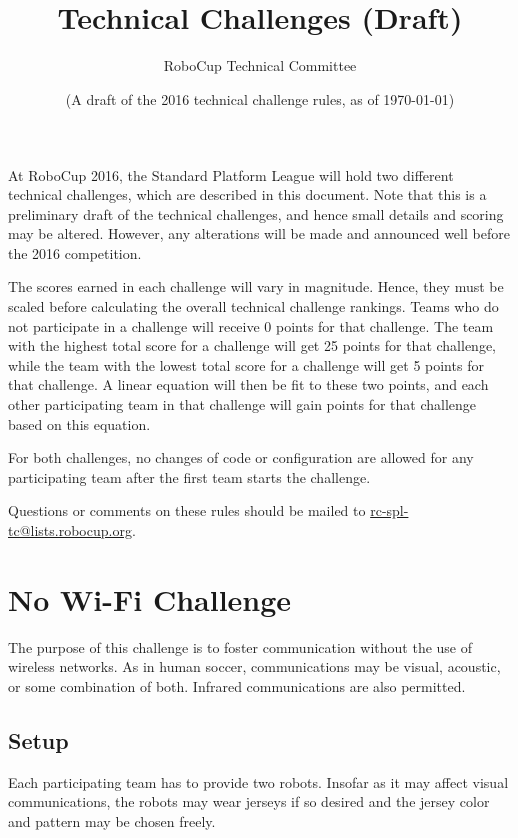 \documentclass[12pt]{article}
\title{\leaguename \\ Technical Challenges (Draft)}
\author{RoboCup Technical Committee}
\date{(A draft of the 2016 technical challenge rules, as of \today)}
\begin{document}
\maketitle

At RoboCup 2016, the Standard Platform League will hold two different technical challenges, which are described in this document.  Note that this is a preliminary draft of the technical challenges, and hence small details and scoring may be altered.  However, any alterations will be made and announced well before the 2016 competition.

The scores earned in each challenge will vary in magnitude.  Hence, they must be scaled before calculating the overall technical challenge rankings.  Teams who do not participate in a challenge will receive 0 points for that challenge.  The team with the highest total score for a challenge will get 25 points for that challenge, while the team with the lowest total score for a challenge will get 5 points for that challenge.  A linear equation will then be fit to these two points, and each other participating team in that challenge will gain points for that challenge based on this equation.

For both challenges, no changes of code or configuration are allowed for any participating team after the first team starts the challenge. 

Questions or comments on these rules should be mailed to {\small \url{rc-spl-tc@lists.robocup.org}}.

\vfill

\renewcommand\contentsname{Challenges}
\tableofcontents
\setcounter{tocdepth}{1}

\thispagestyle{fancy}

\clearpage

\cfoot{\thepage}
\setcounter{page}{1}

\newcommand{\openMinNum}{three}




\section{No Wi-Fi Challenge}

The purpose of this challenge is to foster communication without the use of wireless networks.
As in human soccer, communications may be visual, acoustic, or some combination of both.
Infrared communications are also permitted.

\subsection{Setup}
Each participating team has to provide two robots. Insofar as it may affect visual communications,
the robots may wear jerseys if so desired and the
jersey color and pattern may be chosen freely. 
\end{document}
